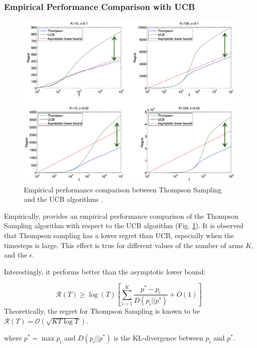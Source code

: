 \documentclass[11pt]{article}
\begin{document}
\subsubsection{Empirical Performance Comparison with UCB}
\begin{figure}[t]
    \centering
    \includegraphics[width=\textwidth]{images/beta-bernoulli-empirical.png}
    \caption{Empirical performance comparison between Thompson Sampling and the UCB algorithms \cite{chapelle2011empirical}.}
    \label{fig:empirical_perf}
\end{figure}

Empirically, \cite{chapelle2011empirical} provides an empirical performance comparison of
the Thompson Sampling algorithm with respect to the UCB algorithm
(Fig. \ref{fig:empirical_perf}). It is observed that Thompson sampling has a lower regret than UCB, especially when the timesteps is large. This effect is true for different values of the number of arms $K$, and the $\epsilon$.

Interestingly, it performs better than the asymptotic lower bound:

$$\mathcal{R}(T) \ge \log(T)\left[\sum_{i=1}^K \frac{p^* - p_i}{D(p_i || p^*)} + O(1)\right]$$
Theoretically, the regret for Thompson Sampling is known to be $\mathcal{R}(T) = \mathcal{O}(\sqrt{KT \log T})$.

where $p^* = \max p_i$ and $D(p_i || p^*)$ is the KL-divergence between $p_i$ and $p^*$.


{


}
\end{document}
